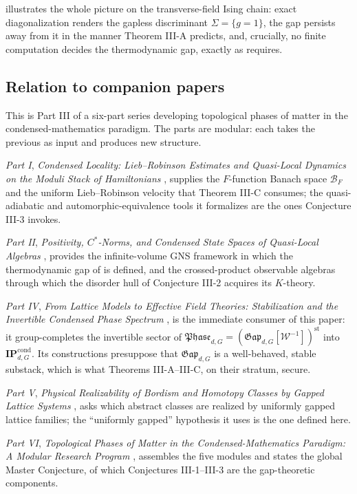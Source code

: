\documentclass[12pt]{article}
\newcommand{\Ffun}{F}                          %
\newcommand{\BF}{\mathcal{B}_{F}}              %
\newcommand{\Gap}{\mathfrak{Gap}}              %
\newcommand{\Phase}{\mathfrak{Phase}}          %
\newcommand{\Weq}{\mathcal{W}}                 %
\newcommand{\st}{\mathrm{st}}                  %
\newcommand{\IPcond}{\mathbf{IP}^{\mathrm{cond}}}  %
\newcommand{\Sig}{\Sigma}                       %
\theoremstyle{plain}
\theoremstyle{definition}
\theoremstyle{remark}
\begin{document}
 illustrates the whole picture on the transverse-field Ising
chain: exact diagonalization renders the gapless discriminant $\Sig=\{g=1\}$, the
gap persists away from it in the manner Theorem III-A predicts, and, crucially, no
finite computation decides the thermodynamic gap, exactly as
 requires.

\subsection{Relation to companion papers}
\label{sec:intro-companions}

This is Part III of a six-part series developing topological phases of matter in the
condensed-mathematics paradigm. The parts are modular: each takes the previous as
input and produces new structure.

\emph{Part I}, \emph{Condensed Locality: Lieb--Robinson Estimates and Quasi-Local
Dynamics on the Moduli Stack of Hamiltonians} \cite{paperLocality}, supplies the
$\Ffun$-function Banach space $\BF$ and the uniform Lieb--Robinson velocity that
Theorem III-C consumes; the quasi-adiabatic and automorphic-equivalence tools it
formalizes are the ones Conjecture III-3 invokes.

\emph{Part II}, \emph{Positivity, $C^*$-Norms, and Condensed State Spaces of
Quasi-Local Algebras} \cite{paperPositivity}, provides the infinite-volume GNS
framework in which the thermodynamic gap of  is defined, and the
crossed-product observable algebras through which the disorder hull of Conjecture
III-2 acquires its $K$-theory.

\emph{Part IV}, \emph{From Lattice Models to Effective Field Theories: Stabilization
and the Invertible Condensed Phase Spectrum} \cite{paperEFT}, is the immediate
consumer of this paper: it group-completes the invertible sector of
$\Phase_{d,G}=(\Gap_{d,G}[\Weq^{-1}])^{\st}$ into $\IPcond_{d,G}$. Its constructions
presuppose that $\Gap_{d,G}$ is a well-behaved, stable substack, which is what
Theorems III-A--III-C, on their stratum, secure.

\emph{Part V}, \emph{Physical Realizability of Bordism and Homotopy Classes by Gapped
Lattice Systems} \cite{paperRealizability}, asks which abstract classes are realized
by uniformly gapped lattice families; the ``uniformly gapped'' hypothesis it uses is
the one defined here.

\emph{Part VI}, \emph{Topological Phases of Matter in the Condensed-Mathematics
Paradigm: A Modular Research Program} \cite{paperSynthesis}, assembles the five
modules and states the global Master Conjecture, of which Conjectures III-1--III-3
are the gap-theoretic components.
\end{document}
